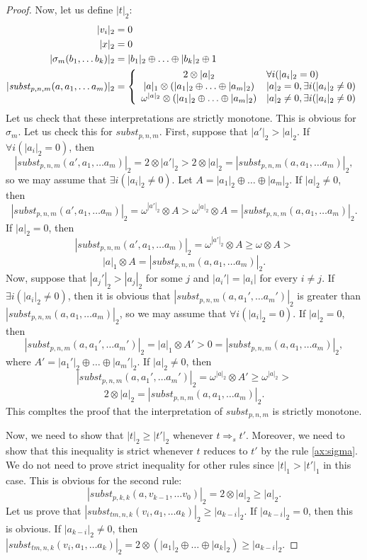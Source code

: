 \documentclass[reqno]{amsart}
\theoremstyle{definition}
\theoremstyle{remark}
\newcommand{\subst}{\mathit{subst}}
\newcommand{\tm}{\mathit{tm}}
\numberwithin{figure}{section}
\begin{document}
\begin{proof}
Now, let us define $|t|_2$:
\begin{align*}
|v_i|_2 & = 0 \\
|x|_2 & = 0 \\
|\sigma_m(b_1, \ldots b_k)|_2 & = |b_1|_2 \oplus \ldots \oplus |b_k|_2 \oplus 1 \\
|\subst_{p,n,m}(a, a_1, \ldots a_m)|_2 & = 
\left\{
\begin{array}{c l}	
     2 \otimes |a|_2 & \forall i (|a_i|_2 = 0) \\
     |a|_1 \otimes (|a_1|_2 \oplus \ldots \oplus |a_m|_2) & |a|_2 = 0, \exists i (|a_i|_2 \neq 0) \\
     \omega^{|a|_2} \otimes (|a_1|_2 \oplus \ldots \oplus |a_m|_2) & |a|_2 \neq 0, \exists i (|a_i|_2 \neq 0)
\end{array}\right.
\end{align*}
Let us check that these interpretations are strictly monotone.
This is obvious for $\sigma_m$.
Let us check this for $\subst_{p,n,m}$.
First, suppose that $|a'|_2 > |a|_2$.
If $\forall i (|a_i|_2 = 0)$, then
\[ |\subst_{p,n,m}(a', a_1, \ldots a_m)|_2 = 2 \otimes |a'|_2 > 2 \otimes |a|_2 = |\subst_{p,n,m}(a, a_1, \ldots a_m)|_2, \]
so we may assume that $\exists i (|a_i|_2 \neq 0)$.
Let $A = |a_1|_2 \oplus \ldots \oplus |a_m|_2$.
If $|a|_2 \neq 0$, then
\[ |\subst_{p,n,m}(a', a_1, \ldots a_m)|_2 = \omega^{|a'|_2} \otimes A > \omega^{|a|_2} \otimes A = |\subst_{p,n,m}(a, a_1, \ldots a_m)|_2. \]
If $|a|_2 = 0$, then
\[ |\subst_{p,n,m}(a', a_1, \ldots a_m)|_2 = \omega^{|a'|_2} \otimes A \geq \omega \otimes A > \]
\[ |a|_1 \otimes A = |\subst_{p,n,m}(a, a_1, \ldots a_m)|_2. \]
Now, suppose that $|a_j'|_2 > |a_j|_2$ for some $j$ and $|a_i'| = |a_i|$ for every $i \neq j$.
If $\exists i (|a_i|_2 \neq 0)$, then it is obvious that $|\subst_{p,n,m}(a, a_1', \ldots a_m')|_2$ is greater than $|\subst_{p,n,m}(a, a_1, \ldots a_m)|_2$,
so we may assume that $\forall i (|a_i|_2 = 0)$.
If $|a|_2 = 0$, then
\[ |\subst_{p,n,m}(a, a_1', \ldots a_m')|_2 = |a|_1 \otimes A' > 0 = |\subst_{p,n,m}(a, a_1, \ldots a_m)|_2, \]
where $A' = |a_1'|_2 \oplus \ldots \oplus |a_m'|_2$.
If $|a|_2 \neq 0$, then
\[ |\subst_{p,n,m}(a, a_1', \ldots a_m')|_2 = \omega^{|a|_2} \otimes A' \geq \omega^{|a|_2} > \]
\[ 2 \otimes |a|_2 = |\subst_{p,n,m}(a, a_1, \ldots a_m)|_2. \]
This compltes the proof that the interpretation of $\subst_{p,n,m}$ is strictly monotone.

Now, we need to show that $|t|_2 \geq |t'|_2$ whenever $t \Rightarrow_s t'$.
Moreover, we need to show that this inequality is strict whenever $t$ reduces to $t'$ by the rule \eqref{ax:sigma}.
We do not need to prove strict inequality for other rules since $|t|_1 > |t'|_1$ in this case.
This is obvious for the second rule:
\[ |\subst_{p,k,k}(a, v_{k-1}, \ldots v_0)|_2 = 2 \otimes |a|_2 \geq |a|_2. \]
Let us prove that $|\subst_{\tm,n,k}(v_i, a_1, \ldots a_k)|_2 \geq |a_{k-i}|_2$.
If $|a_{k-i}|_2 = 0$, then this is obvious.
If $|a_{k-i}|_2 \neq 0$, then $|\subst_{\tm,n,k}(v_i, a_1, \ldots a_k)|_2 = 2 \otimes (|a_1|_2 \oplus \ldots \oplus |a_k|_2) \geq |a_{k-i}|_2$.


\end{proof}
\end{document}
